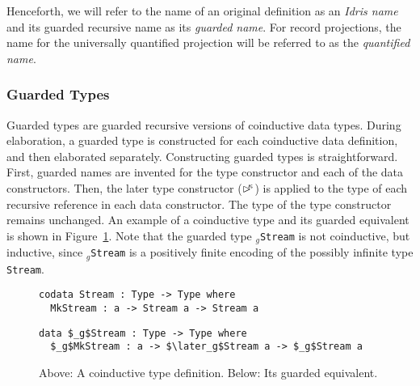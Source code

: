 Henceforth, we will refer to the name of an original definition as
an \emph{Idris name} and its guarded recursive name as its \emph{guarded name}. For
record projections, the name for the universally quantified projection will be
referred to as the \emph{quantified name}. 



\subsubsection{Guarded Types}
Guarded types are guarded recursive versions of coinductive data types. During
elaboration, a guarded type is constructed for each coinductive data definition,
and then elaborated separately. Constructing guarded types is
straightforward. First, guarded names are invented for the type constructor and
each of the data constructors. Then, the later type constructor ($\rhd^{\!\!\kappa}$)
is applied to the type of each recursive reference in each data
constructor. The type of the type constructor remains unchanged. An example of a
coinductive type and its guarded equivalent is shown in
Figure~\ref{fig:guarded_stream_inf}. Note that the guarded type \texttt{$_g$Stream} is not coinductive, but
inductive, since \texttt{$_g$Stream} is a positively finite encoding of the
possibly infinite type \texttt{Stream}.

\begin{figure}[h]
\begin{lstlisting}[mathescape]
codata Stream : Type -> Type where
  MkStream : a -> Stream a -> Stream a
\end{lstlisting}
\begin{lstlisting}[mathescape]
data $_g$Stream : Type -> Type where
  $_g$MkStream : a -> $\later_g$Stream a -> $_g$Stream a
\end{lstlisting}
  \caption{Above: A coinductive type definition. Below: Its guarded equivalent.}
  \label{fig:guarded_stream_inf}
\end{figure}

